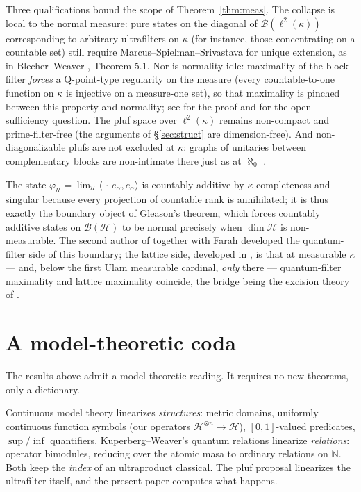 \documentclass[11pt,reqno]{amsart}
\theoremstyle{definition}
\newcommand{\HH}{\mathcal{H}}
\newcommand{\BH}{\mathcal{B}(\HH)}
\newcommand{\N}{\mathbb{N}}
\begin{document}
Three qualifications bound the scope of Theorem~\ref{thm:meas}. The collapse is local
to the normal measure:
pure states on the diagonal of $\mathcal B(\ell^2(\kappa))$ corresponding to arbitrary
ultrafilters on $\kappa$ (for instance, those concentrating on a countable set) still
require Marcus--Spielman--Srivastava for unique extension, as in Blecher--Weaver
\cite{BlecherWeaver}, Theorem 5.1. Nor is normality idle: maximality of the block
filter \emph{forces} a Q-point-type regularity on the measure (every countable-to-one
function on $\kappa$ is injective on a measure-one set), so that maximality is pinched
between this property and normality; see \cite{FWIII} for the proof and for the open
sufficiency question. The pluf space over $\ell^2(\kappa)$ remains
non-compact and prime-filter-free (the arguments of \S\ref{sec:struct} are
dimension-free). And non-diagonalizable plufs are not excluded at $\kappa$: graphs of
unitaries between complementary blocks are non-intimate there just as at $\aleph_0$
\cite{FWII}.

The state $\varphi_{\mathcal U}=\lim_{\mathcal U}\langle\,\cdot\,e_\alpha,e_\alpha\rangle$
is countably additive by $\kappa$-completeness and singular because every projection of
countable rank is annihilated; it is thus exactly the boundary object of Gleason's
theorem, which forces countably additive states on $\BH$ to be normal precisely when
$\dim\HH$ is non-measurable. The second author of \cite{BlecherWeaver} together with
Farah developed the quantum-filter side of this boundary; the lattice side, developed in
\cite{FWIII}, is that at measurable $\kappa$ --- and, below the first Ulam measurable
cardinal, \emph{only} there --- quantum-filter maximality and lattice maximality
coincide, the bridge being the excision theory of \cite{BlecherWeaver}.

\section{A model-theoretic coda}\label{sec:coda}

The results above admit a model-theoretic reading. It requires no new theorems, only a
dictionary.

Continuous model theory \cite{BYBHU,FHS} linearizes \emph{structures}: metric domains,
uniformly continuous function symbols (our operators $\HH^{\otimes n}\to\HH$),
$[0,1]$-valued predicates, $\sup/\inf$ quantifiers. Kuperberg--Weaver's quantum relations
\cite{KuperbergWeaver} linearize \emph{relations}: operator bimodules, reducing over the
atomic masa to ordinary relations on $\N$. Both keep the \emph{index} of an ultraproduct
classical. The pluf proposal linearizes the ultrafilter itself, and the present paper
computes what happens.
\end{document}
